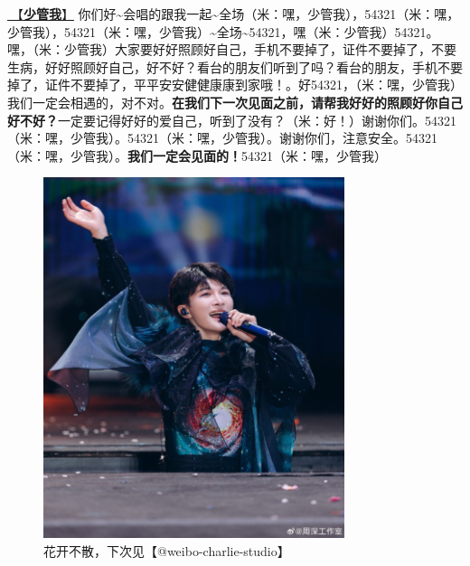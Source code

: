 \documentclass[]{ctexbook}
\begin{document}
\hyperref[watch-ur-manners]{🎵【\textbf{少管我}】} 你们好\textasciitilde 会唱的跟我一起\textasciitilde 全场（米：嘿，少管我），54321（米：嘿，少管我），54321（米：嘿，少管我）\textasciitilde 全场\textasciitilde54321，嘿（米：少管我）54321。嘿，（米：少管我）大家要好好照顾好自己，手机不要掉了，证件不要掉了，不要生病，好好照顾好自己，好不好？看台的朋友们听到了吗？看台的朋友，手机不要掉了，证件不要掉了，平平安安健健康康到家哦！。好54321，（米：嘿，少管我）我们一定会相遇的，对不对。\textbf{在我们下一次见面之前，请帮我好好的照顾好你自己好不好？}一定要记得好好的爱自己，听到了没有？（米：好！）谢谢你们。54321（米：嘿，少管我）。54321（米：嘿，少管我）。谢谢你们，注意安全。54321（米：嘿，少管我）。\textbf{我们一定会见面的！}54321（米：嘿，少管我）

\begin{figure}

{\centering \includegraphics[width=250pt]{img/nanchang-20241123/003} 

}

\caption{花开不散，下次见【@weibo-charlie-studio】}\label{fig:unnamed-chunk-146}
\end{figure}
\end{document}
